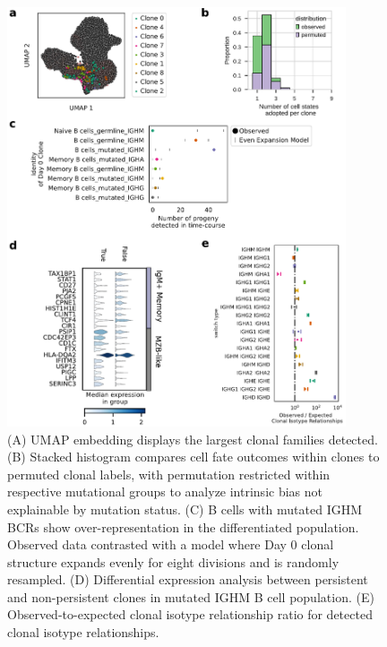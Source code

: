 \begin{figure}[hbt!]
\centering
\includegraphics[width=10cm, keepaspectratio]{figs/InVitro/fig3_bcd.pdf}
\caption[Clonal families allow inference of intrinsic proliferative ability, limited clonal fate outcomes, map of class-switching \textit{in vitro}.]{(A) UMAP embedding displays the largest clonal families detected. (B) Stacked histogram compares cell fate outcomes within clones to permuted clonal labels, with permutation restricted within respective mutational groups to analyze intrinsic bias not explainable by mutation status. (C) B cells with mutated IGHM BCRs show over-representation in the differentiated population. Observed data contrasted with a model where Day 0 clonal structure expands evenly for eight divisions and is randomly resampled. (D) Differential expression analysis between persistent and non-persistent clones in mutated IGHM B cell population. (E) Observed-to-expected clonal isotype relationship ratio for detected clonal isotype relationships.}
\label{fig:paper2_fig_3}
\end{figure}


